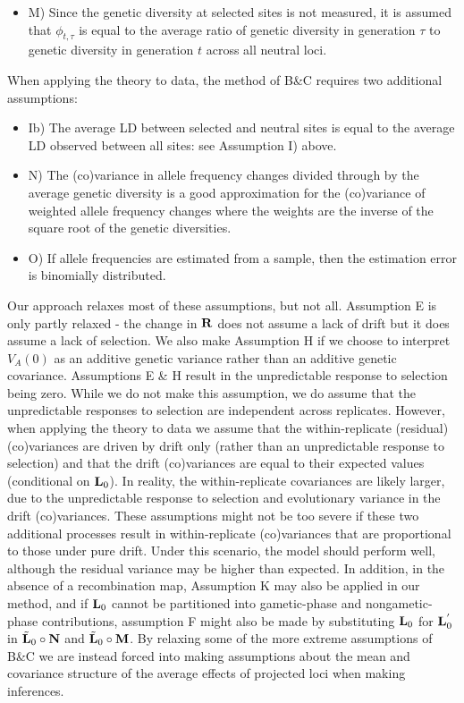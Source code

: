 \documentclass[12pt]{article}
\begin{document}
\begin{bibunit}
\begin{itemize}
\item M) Since the genetic diversity at selected sites is not measured, it is assumed that $\phi_{t,\tau}$ is equal to the average ratio of genetic diversity in generation $\tau$ to genetic diversity in generation $t$ across all neutral loci.
\end{itemize}

When applying the theory to data, the method of B\&C requires two additional assumptions:

\begin{itemize}

\item Ib) The average LD between selected and neutral sites is equal to the average LD observed between all sites: see Assumption I) above.

\item N) The (co)variance in allele frequency changes divided through by the average genetic diversity is a good approximation for the (co)variance of weighted allele frequency changes where the weights are the inverse of the square root of the genetic diversities. 

\item O) If allele frequencies are estimated from a sample, then the estimation error is binomially distributed.
\end{itemize}

Our approach relaxes most of these assumptions, but not all. Assumption E is only partly relaxed - the change in ${\bf R}$ does not assume a lack of drift but it does assume a lack of selection. We also make Assumption H if we choose to interpret $V_A(0)$ as an additive genetic variance rather than an additive genetic covariance. Assumptions E \& H result in the unpredictable response to selection being zero. While we do not make this assumption, we do assume that the unpredictable responses to selection are independent across replicates. However, when applying the theory to data we assume that the within-replicate (residual) (co)variances are driven by drift only (rather than an unpredictable response to selection) and that the drift (co)variances are equal to their expected values (conditional on ${\bf L}_0$). In reality, the within-replicate covariances are likely larger, due to the unpredictable response to selection and evolutionary variance in the drift (co)variances. These assumptions might not be too severe if these two additional processes result in within-replicate (co)variances that are proportional to those under pure drift. Under this scenario, the model should perform well, although the residual variance may be higher than expected. In addition, in the absence of a recombination map, Assumption K may also be applied in our method, and if ${\bf L}_0$ cannot be partitioned into gametic-phase and nongametic-phase contributions, assumption F might also be made by substituting ${\bf L}_0$ for ${\bf L}^{'}_0$ in $\tilde{\bf L}_0\circ{\bf N}$ and $\tilde{\bf L}_0\circ{\bf M}$. By relaxing some of the more extreme assumptions of B\&C we are instead forced into making assumptions about the mean and covariance structure of the average effects of projected loci when making inferences. 


\end{bibunit}
\end{document}
